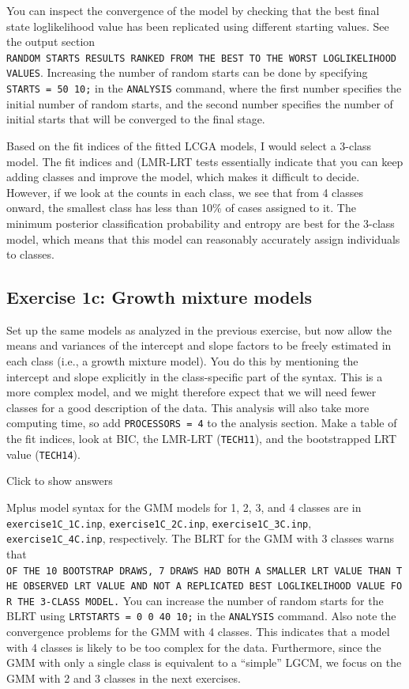 \documentclass[
]{book}
\begin{document}
You can inspect the convergence of the model by checking that the best final state loglikelihood value has been replicated using different starting values. See the output section \texttt{RANDOM\ STARTS\ RESULTS\ RANKED\ FROM\ THE\ BEST\ TO\ THE\ WORST\ LOGLIKELIHOOD\ VALUES}. Increasing the number of random starts can be done by specifying \texttt{STARTS\ =\ 50\ 10;} in the \texttt{ANALYSIS} command, where the first number specifies the initial number of random starts, and the second number specifies the number of initial starts that will be converged to the final stage.

Based on the fit indices of the fitted LCGA models, I would select a 3-class model. The fit indices and (LMR-LRT tests essentially indicate that you can keep adding classes and improve the model, which makes it difficult to decide. However, if we look at the counts in each class, we see that from 4 classes onward, the smallest class has less than 10\% of cases assigned to it. The minimum posterior classification probability and entropy are best for the 3-class model, which means that this model can reasonably accurately assign individuals to classes.

\hypertarget{exercise-1c-growth-mixture-models}{%
\subsection{Exercise 1c: Growth mixture models}\label{exercise-1c-growth-mixture-models}}

Set up the same models as analyzed in the previous exercise, but now allow the means and variances of the intercept and slope factors to be freely estimated in each class (i.e., a growth mixture model). You do this by mentioning the intercept and slope explicitly in the class-specific part of the syntax. This is a more complex model, and we might therefore expect that we will need fewer classes for a good description of the data. This analysis will also take more computing time, so add \texttt{PROCESSORS\ =\ 4} to the analysis section. Make a table of the fit indices, look at BIC, the LMR-LRT (\texttt{TECH11}), and the bootstrapped LRT value (\texttt{TECH14}).

Click to show answers

Mplus model syntax for the GMM models for 1, 2, 3, and 4 classes are in \texttt{exercise1C\_1C.inp}, \texttt{exercise1C\_2C.inp}, \texttt{exercise1C\_3C.inp}, \texttt{exercise1C\_4C.inp}, respectively. The BLRT for the GMM with 3 classes warns that \texttt{OF\ THE\ 10\ BOOTSTRAP\ DRAWS,\ 7\ DRAWS\ HAD\ BOTH\ A\ SMALLER\ LRT\ VALUE\ THAN\ THE\ OBSERVED\ LRT\ VALUE\ AND\ NOT\ A\ REPLICATED\ BEST\ LOGLIKELIHOOD\ VALUE\ FOR\ THE\ 3-CLASS\ MODEL.} You can increase the number of random starts for the BLRT using \texttt{LRTSTARTS\ =\ 0\ 0\ 40\ 10;} in the \texttt{ANALYSIS} command. Also note the convergence problems for the GMM with 4 classes. This indicates that a model with 4 classes is likely to be too complex for the data. Furthermore, since the GMM with only a single class is equivalent to a ``simple'' LGCM, we focus on the GMM with 2 and 3 classes in the next exercises.
\end{document}

